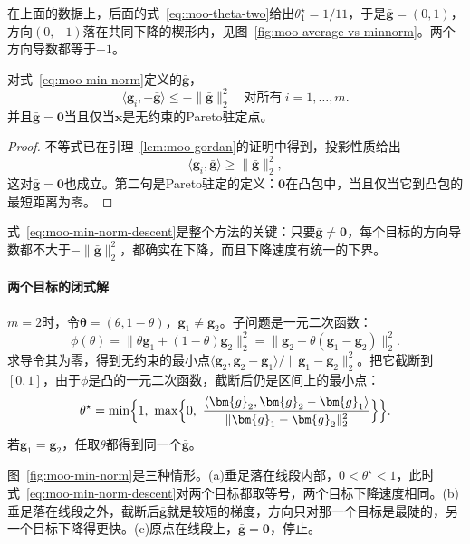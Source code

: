 在上面的数据上，后面的式~\eqref{eq:moo-theta-two}给出$\theta_1^\star=1/11$，于是$\bar{\bm{g}}=(0,1)$，方向$(0,-1)$落在共同下降的楔形内，见图~\ref{fig:moo-average-vs-minnorm}。两个方向导数都等于$-1$。

\begin{lemma}[最小范数组合的下降性质]
\label{lem:moo-min-norm}
对式~\eqref{eq:moo-min-norm}定义的$\bar{\bm{g}}$，
\begin{equation}
 \langle\bm{g}_i,-\bar{\bm{g}}\rangle\leq-\lVert\bar{\bm{g}}\rVert_2^2\quad\text{对所有}\ i=1,\ldots,m.
 \label{eq:moo-min-norm-descent}
\end{equation}
并且$\bar{\bm{g}}=\bm{0}$当且仅当$\bm{x}$是无约束的Pareto驻定点。
\end{lemma}

\begin{proof}
不等式已在引理~\ref{lem:moo-gordan}的证明中得到，投影性质给出
\[
 \langle\bm{g}_i,\bar{\bm{g}}\rangle\geq\lVert\bar{\bm{g}}\rVert_2^2,
\]
这对$\bar{\bm{g}}=\bm{0}$也成立。第二句是Pareto驻定的定义：$\bm{0}$在凸包中，当且仅当它到凸包的最短距离为零。
\end{proof}

式~\eqref{eq:moo-min-norm-descent}是整个方法的关键：只要$\bar{\bm{g}}\neq\bm{0}$，每个目标的方向导数都不大于$-\lVert\bar{\bm{g}}\rVert_2^2$，都确实在下降，而且下降速度有统一的下界。

\paragraph{两个目标的闭式解}
$m=2$时，令$\bm{\theta}=(\theta,1-\theta)$，$\bm{g}_1\neq\bm{g}_2$。子问题是一元二次函数：
\[
 \phi(\theta)=\lVert\theta\bm{g}_1+(1-\theta)\bm{g}_2\rVert_2^2=\lVert\bm{g}_2+\theta(\bm{g}_1-\bm{g}_2)\rVert_2^2.
\]
求导令其为零，得到无约束的最小点$\langle\bm{g}_2,\bm{g}_2-\bm{g}_1\rangle/\lVert\bm{g}_1-\bm{g}_2\rVert_2^2$。把它截断到$[0,1]$，由于$\phi$是凸的一元二次函数，截断后仍是区间上的最小点：
\begin{equation}
 \theta^\star=\min\Bigl\{1,\ \max\Bigl\{0,\ \frac{\langle\bm{g}_2,\bm{g}_2-\bm{g}_1\rangle}{\lVert\bm{g}_1-\bm{g}_2\rVert_2^2}\Bigr\}\Bigr\}.
 \label{eq:moo-theta-two}
\end{equation}
若$\bm{g}_1=\bm{g}_2$，任取$\theta$都得到同一个$\bar{\bm{g}}$。

图~\ref{fig:moo-min-norm}是三种情形。(a)垂足落在线段内部，$0<\theta^\star<1$，此时式~\eqref{eq:moo-min-norm-descent}对两个目标都取等号，两个目标下降速度相同。(b)垂足落在线段之外，截断后$\bar{\bm{g}}$就是较短的梯度，方向只对那一个目标是最陡的，另一个目标下降得更快。(c)原点在线段上，$\bar{\bm{g}}=\bm{0}$，停止。

